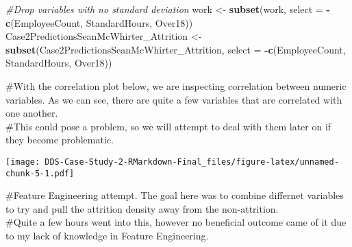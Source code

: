 \documentclass[]{article}
\newenvironment{Shaded}{\begin{snugshade}}{\end{snugshade}}
\newcommand{\CommentTok}[1]{\textcolor[rgb]{0.56,0.35,0.01}{\textit{#1}}}
\newcommand{\DataTypeTok}[1]{\textcolor[rgb]{0.13,0.29,0.53}{#1}}
\newcommand{\DecValTok}[1]{\textcolor[rgb]{0.00,0.00,0.81}{#1}}
\newcommand{\FloatTok}[1]{\textcolor[rgb]{0.00,0.00,0.81}{#1}}
\newcommand{\KeywordTok}[1]{\textcolor[rgb]{0.13,0.29,0.53}{\textbf{#1}}}
\newcommand{\NormalTok}[1]{#1}
\newcommand{\OperatorTok}[1]{\textcolor[rgb]{0.81,0.36,0.00}{\textbf{#1}}}
\newcommand{\StringTok}[1]{\textcolor[rgb]{0.31,0.60,0.02}{#1}}
\begin{document}
\begin{Shaded}
\begin{Highlighting}[]
\CommentTok{#Drop variables with no standard deviation}
\NormalTok{work <-}\StringTok{ }\KeywordTok{subset}\NormalTok{(work, }\DataTypeTok{select =} \OperatorTok{-}\KeywordTok{c}\NormalTok{(EmployeeCount, StandardHours, Over18))}
\NormalTok{Case2PredictionsSeanMcWhirter_Attrition <-}\StringTok{ }\KeywordTok{subset}\NormalTok{(Case2PredictionsSeanMcWhirter_Attrition, }\DataTypeTok{select =} \OperatorTok{-}\KeywordTok{c}\NormalTok{(EmployeeCount, StandardHours, Over18))}
\end{Highlighting}
\end{Shaded}

\#With the correlation plot below, we are inspecting correlation between
numeric variables. As we can see, there are quite a few variables that
are correlated with one another.\\
\#This could pose a problem, so we will attempt to deal with them later
on if they become problematic.

\begin{Shaded}
\end{Shaded}

\texttt{[image: DDS-Case-Study-2-RMarkdown-Final\_files/figure-latex/unnamed-chunk-5-1.pdf]}

\#Feature Engineering attempt. The goal here was to combine differnet
variables to try and pull the attrition density away from the
non-attrition.\\
\#Quite a few hours went into this, however no beneficial outcome came
of it due to my lack of knowledge in Feature Engineering.
\end{document}
